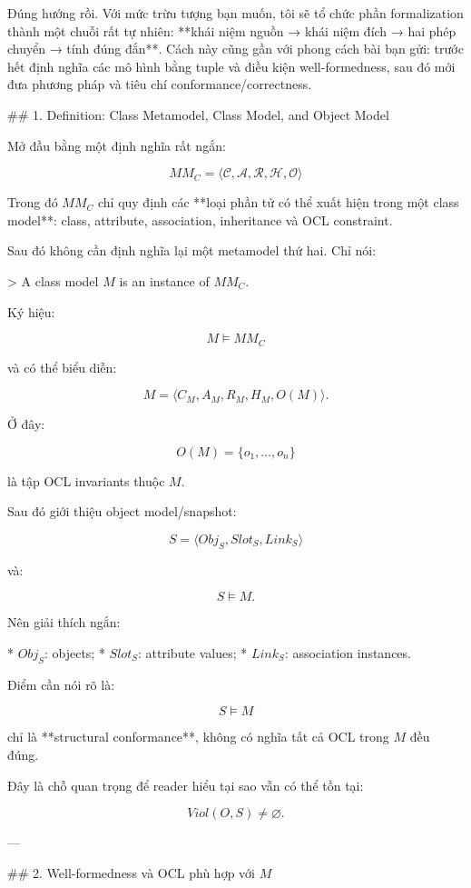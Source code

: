 Đúng hướng rồi. Với mức trừu tượng bạn muốn, tôi sẽ tổ chức phần formalization thành một chuỗi rất tự nhiên: **khái niệm nguồn → khái niệm đích → hai phép chuyển → tính đúng đắn**. Cách này cũng gần với phong cách bài bạn gửi: trước hết định nghĩa các mô hình bằng tuple và điều kiện well-formedness, sau đó mới đưa phương pháp và tiêu chí conformance/correctness.  

## 1. Definition: Class Metamodel, Class Model, and Object Model

Mở đầu bằng một định nghĩa rất ngắn:

$$
\boxed{
MM_C=\langle \mathcal C,\mathcal A,\mathcal R,\mathcal H,\mathcal O\rangle
}
$$

Trong đó \(MM_C\) chỉ quy định các **loại phần tử có thể xuất hiện trong một class model**: class, attribute, association, inheritance và OCL constraint.

Sau đó không cần định nghĩa lại một metamodel thứ hai. Chỉ nói:

> A class model \(M\) is an instance of \(MM_C\).

Ký hiệu:

$$
\boxed{
M\models MM_C
}
$$

và có thể biểu diễn:

$$
\boxed{
M=\langle C_M,A_M,R_M,H_M,O(M)\rangle.
}
$$

Ở đây:

$$
O(M)=\{o_1,\ldots,o_n\}
$$

là tập OCL invariants thuộc \(M\).

Sau đó giới thiệu object model/snapshot:

$$
\boxed{
S=\langle Obj_S,Slot_S,Link_S\rangle
}
$$

và:

$$
\boxed{
S\models M.
}
$$

Nên giải thích ngắn:

* \(Obj_S\): objects;
* \(Slot_S\): attribute values;
* \(Link_S\): association instances.

Điểm cần nói rõ là:

$$
S\models M
$$

chỉ là **structural conformance**, không có nghĩa tất cả OCL trong \(M\) đều đúng.

Đây là chỗ quan trọng để reader hiểu tại sao vẫn có thể tồn tại:

$$
Viol(O,S)\neq\varnothing.
$$

---

## 2. Well-formedness và OCL phù hợp với \(M\)

